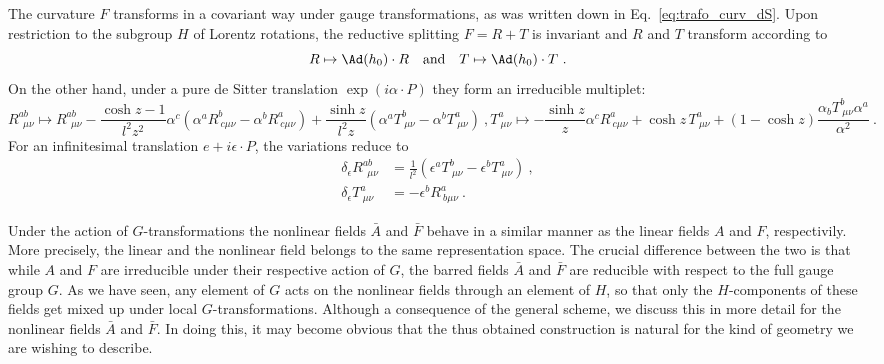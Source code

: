 \documentclass[11pt]{article}
\begin{document}
The curvature $F$ transforms in a covariant way under gauge 
transformations, as was written down in 
Eq.~\eqref{eq:trafo_curv_dS}. Upon restriction to the subgroup 
$H$ of Lorentz rotations, the reductive splitting $F = R + T$ is 
invariant and $R$ and $T$ transform according to
\begin{displaymath}
	R \mapsto \Ad(h_0)\cdot R
	\quad \text{and} \quad
	T \mapsto \Ad(h_0)\cdot T~.
\end{displaymath}
On the other hand, under a pure de Sitter translation 
$\exp(i\alpha\cdot P)$ they form an irreducible multiplet:
\begin{subequations}
\begin{equation}
	R^{ab}_{~~\mu\nu} \mapsto R^{ab}_{~~\mu\nu} - \frac{\cosh z - 
		1}{l^2z^2} \alpha^c (\alpha^a R^b_{~c\mu\nu} -  \alpha^b 
	R^a_{~c\mu\nu}) + \frac{\sinh z}{l^2 z} (\alpha^a 
	T^b_{~\mu\nu} - \alpha^b T^a_{~\mu\nu})~,
\end{equation}
\begin{equation}
	T^a_{~\mu\nu} \mapsto -\frac{\sinh z}{z} \alpha^c 
	R^a_{~c\mu\nu} + \cosh z\, T^a_{~\mu\nu} + (1 - \cosh z) 
	\frac{\alpha_b T^b_{~\mu\nu}\alpha^a}{\alpha^2}~.
\end{equation}
\end{subequations}
For an infinitesimal translation $e + i\epsilon\cdot P$, the 
variations reduce to
\begin{subequations}
\begin{align}
	\delta_\epsilon R^{ab}_{~~\mu\nu} &= \frac{1}{l^2}(\epsilon^a 
	T^b_{~\mu\nu} - \epsilon^b T^a_{~\mu\nu})~, \\
	\delta_\epsilon T^a_{~\mu\nu} &= -\epsilon^b R^a_{~b\mu\nu}~.
\end{align}
\end{subequations}

Under the action of $G$-transformations the nonlinear fields 
$\bar{A}$ and $\bar{F}$ behave in a similar manner as the linear 
fields $A$ and $F$, respectivily.  More precisely, the linear and 
the nonlinear field belongs to the same representation space. The 
crucial difference between the two is that while $A$ and $F$ are 
irreducible under their respective action of $G$, the barred 
fields $\bar{A}$ and $\bar{F}$ are reducible with respect to the 
full gauge group $G$. As we have seen, any element of $G$ acts on 
the nonlinear fields through an element of $H$, so that only the 
$H$-components of these fields get mixed up under local 
$G$-transformations.
Although a consequence of the general scheme, we discuss this in 
more detail for the nonlinear fields $\bar{A}$ and $\bar{F}$. In  
doing this, it may become obvious that the thus obtained 
construction is natural for the kind of geometry we are wishing 
to describe.
\end{document}
